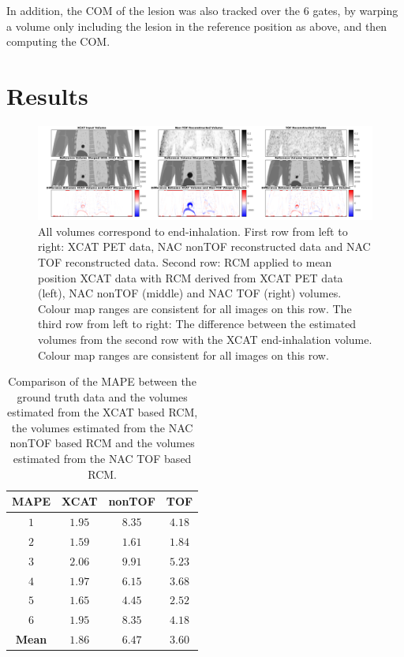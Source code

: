 \documentclass[10pt,twocolumn,twoside,letterpaper]{IEEEtran}
\begin{document}
In addition, the \gls{COM} of the lesion was also tracked over the $6$ gates, by warping a volume only including the lesion in the reference position as above, and then computing the \gls{COM}.

\section{Results}
\begin{figure}
    \centering
    \includegraphics[width=1.0\linewidth]{figures/output.png}
    \captionsetup{singlelinecheck=false, justification=centering}
    \caption{All volumes correspond to end-inhalation. First row from left to right: \gls{XCAT} \gls{PET} data, \gls{NAC} \gls{nonTOF} reconstructed data and \gls{NAC} \gls{TOF} reconstructed data. Second row: \gls{RCM} applied to mean position \gls{XCAT} data with \gls{RCM} derived from \gls{XCAT} \gls{PET} data (left), \gls{NAC} \gls{nonTOF} (middle) and \gls{NAC} \gls{TOF} (right) volumes. Colour map ranges are consistent for all images on this row. The third row from left to right: The difference between the estimated volumes from the second row with the \gls{XCAT} end-inhalation volume. Colour map ranges are consistent for all images on this row.}
    \label{fig:output}
\end{figure}

\begin{table}
    \centering
    \captionsetup{singlelinecheck=false, justification=centering}
    \caption{Comparison of the \gls{MAPE} between the ground truth data and the volumes estimated from the \gls{XCAT} based \gls{RCM}, the volumes estimated from the \gls{NAC} \gls{nonTOF} based \gls{RCM} and the volumes estimated from the \gls{NAC} \gls{TOF} based \gls{RCM}.}
    
    \resizebox*{1.0\linewidth}{!}
    {
        \begin{tabular}{||c|ccc||}
        \hline
        \textbf{\gls{MAPE}} & \textbf{XCAT} & \textbf{\gls{nonTOF}} & \textbf{\gls{TOF}} \\
        \hline
        \textbf{$1$} & $1.95$ & $8.35$ & $4.18$ \\
        \textbf{$2$} & $1.59$ & $1.61$ & $1.84$ \\
        \textbf{$3$} & $2.06$ & $9.91$ & $5.23$ \\
        \textbf{$4$} & $1.97$ & $6.15$ & $3.68$ \\
        \textbf{$5$} & $1.65$ & $4.45$ & $2.52$ \\
        \textbf{$6$} & $1.95$ & $8.35$ & $4.18$ \\
        \hline
        \textbf{Mean} & $1.86$ & $6.47$ & $3.60$ \\
        \hline
    \end{tabular}
    }
    \label{tab:mape}
\end{table}
\end{document}
